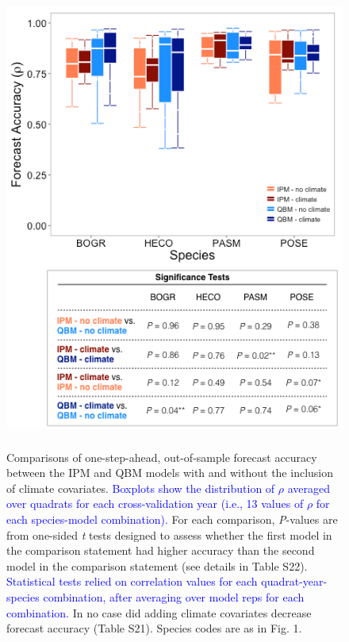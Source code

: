 \documentclass[12pt,]{article}
\begin{document}
\begin{figure}[!ht]
  \centering
      \includegraphics[height=6in]{./components/forecast_accuracy_mockup_boxplot.png}
  \caption{Comparisons of one-step-ahead, out-of-sample forecast accuracy between the IPM and QBM models with and without the inclusion of climate covariates. \textcolor{blue}{Boxplots show the distribution of $\rho$ averaged over quadrats for each cross-validation year (i.e., 13 values of $\rho$ for each species-model combination).} For each comparison, \emph{P}-values are from one-sided \emph{t} tests designed to assess whether the first model in the comparison statement had higher accuracy than the second model in the comparison statement (see details in Table S22). \textcolor{blue}{Statistical tests relied on correlation values for each quadrat-year-species combination, after averaging over model reps for each combination.} In no case did adding climate covariates decrease forecast accuracy (Table S21). Species codes are as in Fig. 1.}
\end{figure}

\newpage{}
\end{document}
